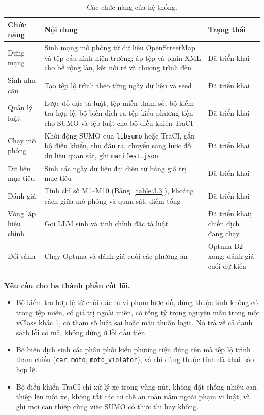 \documentclass[../DoAn.tex]{subfiles}
\begin{document}
\begin{table}[ht]
\centering
\small
\caption{Các chức năng của hệ thống.}
\label{table:2.3}
\begin{tabular}{|p{2.8cm}|p{8.4cm}|p{2.6cm}|}
\hline
\textbf{Chức năng} & \textbf{Nội dung} & \textbf{Trạng thái} \\
\hline
Dựng mạng & Sinh mạng mô phỏng từ dữ liệu OpenStreetMap và tệp cấu hình hiện trường; áp tệp vá plain XML cho bề rộng làn, kết nối rẽ và chương trình đèn & Đã triển khai \\
\hline
Sinh nhu cầu & Tạo tệp lộ trình theo từng ngày dữ liệu và seed & Đã triển khai \\
\hline
Quản lý luật & Lược đồ đặc tả luật, tệp miền tham số, bộ kiểm tra hợp lệ, bộ biên dịch ra tệp kiểu phương tiện cho SUMO và tệp luật cho bộ điều khiển TraCI & Đã triển khai \\
\hline
Chạy mô phỏng & Khởi động SUMO qua \texttt{libsumo} hoặc TraCI, gắn bộ điều khiển, thu đầu ra, chuyển sang lược đồ dữ liệu quan sát, ghi \texttt{manifest.json} & Đã triển khai \\
\hline
Dữ liệu mục tiêu & Sinh các ngày dữ liệu đại diện từ bảng giá trị mục tiêu & Đã triển khai \\
\hline
Đánh giá & Tính chỉ số M1--M10 (Bảng~\ref{table:3.3}), khoảng cách giữa mô phỏng và quan sát, điểm tổng & Đã triển khai \\
\hline
Vòng lặp hiệu chỉnh & Gọi LLM sinh và tinh chỉnh đặc tả luật & Đã triển khai; chiến dịch đang chạy \\
\hline
Đối sánh & Chạy Optuna và đánh giá cuối các phương án & Optuna B2 xong; đánh giá cuối dự kiến \\
\hline
\end{tabular}
\end{table}

\textbf{Yêu cầu cho ba thành phần cốt lõi.}
\begin{itemize}
    \item Bộ kiểm tra hợp lệ từ chối đặc tả vi phạm lược đồ, dùng thuộc tính không có trong tệp miền, có giá trị ngoài miền, có tổng tỷ trọng nguyên mẫu trong một vClass khác 1, có tham số luật sai hoặc mâu thuẫn logic. Nó trả về cả danh sách lỗi có mã, không dừng ở lỗi đầu tiên.
    \item Bộ biên dịch sinh các phân phối kiểu phương tiện đúng tên mà tệp lộ trình tham chiếu (\texttt{car}, \texttt{moto}, \texttt{moto\_violator}), và chỉ dùng thuộc tính đã khai báo hợp lệ.
    \item Bộ điều khiển TraCI chỉ xử lý xe trong vùng nút, không đặt chồng nhiều can thiệp lên một xe, không tắt các cơ chế an toàn nằm ngoài phạm vi luật, và ghi mọi can thiệp cùng việc SUMO có thực thi hay không.
\end{itemize}
\end{document}
